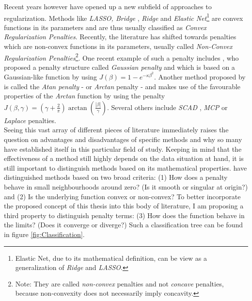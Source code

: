 \documentclass[12pt,a4paper]{article}
\begin{document}
Recent years however have opened up a new subfield of approaches to regularization. Methods like \textit{LASSO, Bridge} \parencite{FrankFriedman1993}, \textit{Ridge} and \textit{Elastic Net}\footnote{Elastic Net, due to its mathematical definition, can be view as a generalization of \textit{Ridge} and \textit{LASSO}.} are convex functions in its parameters and are thus usually classified as \textit{Convex Regularization Penalties}. Recently, the literature has shifted towards penalties which are non-convex functions in its parameters, usually called \textit{Non-Convex Regularization Penalties}\footnote{Note: They are called \textit{non-convex} penalties and not \textit{concave} penalties, because non-convexity does not necessarily imply concavity.}. One recent example of such a penalty includes \textcite{JohnVettamWu2022}, who proposed a penalty structure called \textit{Gaussian penalty} and which is based on a Gaussian-like function by using $J(\beta) = 1 - e^{-\kappa\beta^2}$. Another method proposed by \textcite{WangZhu2016} is called the \textit{Atan penalty} - or \textit{Arctan} penalty - and makes use of the favourable properties of the \textit{Arctan} function by using the penalty $J(\beta, \gamma) = (\gamma + \frac{2}{\pi})\arctan(\frac{|\beta|}{\gamma})$. Several others include \textit{SCAD} \parencite{FanLi2001}, \textit{MCP} \parencite{Zhang2010} or \textit{Laplace} \parencite{TrzaskoManduca2009} penalties.\\

Seeing this vast array of different pieces of literature immediately raises the question on advantages and disadvantages of specific methods and why so many have established itself in this particular field of study. Keeping in mind that the effectiveness of a method still highly depends on the data situation at hand, it is still important to distinguish methods based on its mathematical properties. \textcite{JohnVettamWu2022} have distinguished methods based on two broad criteria: (1) How does a penalty behave in small neighbourhoods around zero? (Is it smooth or singular at origin?) and (2) Is the underlying function convex or non-convex? To better incorporate the proposed concept of this thesis into this body of literature, I am proposing a third property to distinguish penalty terms: (3) How does the function behave in the limits? (Does it converge or diverge?) Such a classification tree can be found in figure \ref{fig:Classification}. \\
\end{document}

